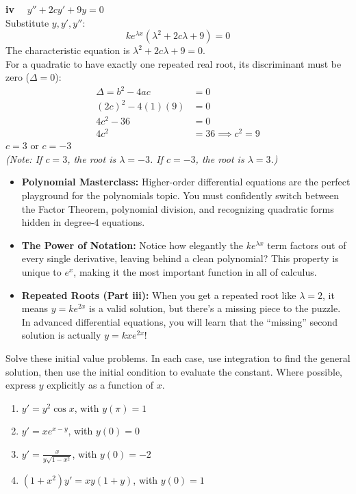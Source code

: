 \begin{solution}
\vspace{0.3cm}
\textbf{iv} $\quad y'' + 2cy' + 9y = 0$ \\
Substitute $y, y', y''$:
\[ ke^{\lambda x}(\lambda^2 + 2c\lambda + 9) = 0 \]
The characteristic equation is $\lambda^2 + 2c\lambda + 9 = 0$. \\
For a quadratic to have exactly one repeated real root, its discriminant must be zero ($\Delta = 0$):
\begin{align*}
    \Delta = b^2 - 4ac &= 0 \\
    (2c)^2 - 4(1)(9) &= 0 \\
    4c^2 - 36 &= 0 \\
    4c^2 &= 36 \implies c^2 = 9
\end{align*}
\textbf{$c = 3 \text{ or } c = -3$} \\
\textit{(Note: If $c=3$, the root is $\lambda = -3$. If $c=-3$, the root is $\lambda = 3$.)}
\end{solution}

\begin{takeaways}
\begin{itemize}[leftmargin=*]
    \item \textbf{Polynomial Masterclass:} Higher-order differential equations are the perfect playground for the polynomials topic. You must confidently switch between the Factor Theorem, polynomial division, and recognizing quadratic forms hidden in degree-4 equations.
    \item \textbf{The Power of Notation:} Notice how elegantly the $ke^{\lambda x}$ term factors out of every single derivative, leaving behind a clean polynomial? This property is unique to $e^x$, making it the most important function in all of calculus.
    \item \textbf{Repeated Roots (Part iii):} When you get a repeated root like $\lambda = 2$, it means $y = ke^{2x}$ is a valid solution, but there's a missing piece to the puzzle. In advanced differential equations, you will learn that the ``missing'' second solution is actually $y = kxe^{2x}$!
\end{itemize}
\end{takeaways}

\begin{problem}
Solve these initial value problems. In each case, use integration to find the general solution, then use the initial condition to evaluate the constant. Where possible, express $y$ explicitly as a function of $x$.

\begin{enumerate}
    \item[\textbf{i}] $y' = y^2 \cos x$, with $y(\pi) = 1$
    \item[\textbf{ii}] $y' = x e^{x-y}$, with $y(0) = 0$
    \item[\textbf{iii}] $y' = \frac{x}{y\sqrt{1-x^2}}$, with $y(0) = -2$
    \item[\textbf{iv}] $(1+x^2)y' = xy(1+y)$, with $y(0) = 1$
\end{enumerate}
\end{problem}

